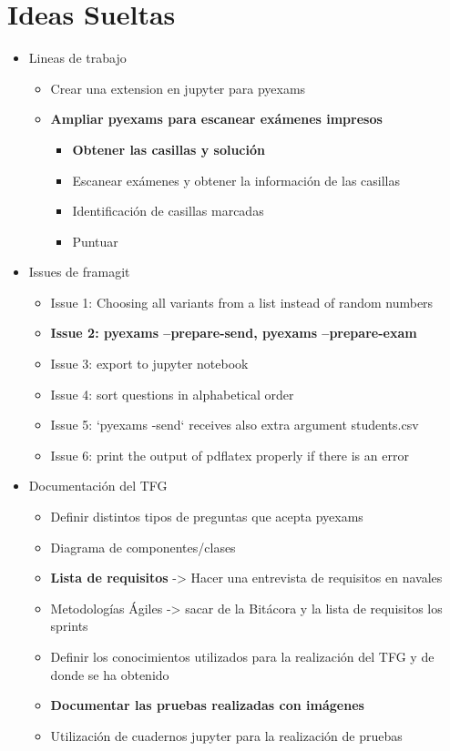\chapter{Ideas Sueltas}

\begin{itemize}
    \item Lineas de trabajo
    \begin{itemize}
        \item Crear una extension en jupyter para pyexams
        \item \textbf{Ampliar pyexams para escanear exámenes impresos}
        \begin{itemize}
            \item \textbf{Obtener las casillas y solución}
            \item Escanear exámenes y obtener la información de las casillas
            \item Identificación de casillas marcadas
            \item Puntuar
        \end{itemize}
    \end{itemize}
    \item Issues de framagit
    \begin{itemize}
        \item Issue 1: Choosing all variants from a list instead of random numbers
        \item \textbf{Issue 2: pyexams --prepare-send, pyexams --prepare-exam}
        \item Issue 3: export to jupyter notebook
        \item Issue 4: sort questions in alphabetical order
        \item Issue 5: `pyexams -send` receives also extra argument students.csv
        \item Issue 6: print the output of pdflatex properly if there is an error
    \end{itemize}
    \item Documentación del TFG
    \begin{itemize}
        \item Definir distintos tipos de preguntas que acepta pyexams
        \item Diagrama de componentes/clases
        \item \textbf{Lista de requisitos} -> Hacer una entrevista de requisitos en navales
        \item Metodologías Ágiles -> sacar de la Bitácora y la lista de requisitos los sprints
        \item Definir los conocimientos utilizados para la realización del TFG y de donde se ha obtenido 
        \item \textbf{Documentar las pruebas realizadas con imágenes}
        \item Utilización de cuadernos jupyter para la realización de pruebas
    \end{itemize}
\end{itemize}

